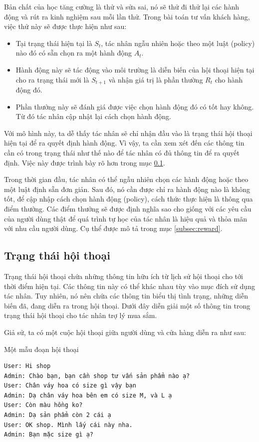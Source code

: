 Bản chất của học tăng cường là thử và sửa sai, nó sẽ thử đi thử lại
các hành động và rút ra kinh nghiệm sau mỗi lần thử. Trong bài toán
tư vấn khách hàng, việc thử này sẽ được thực hiện như sau:

\begin{itemize}
    \item Tại trạng thái hiện tại là $S_t$, tác nhân ngẫu nhiên hoặc
    theo một luật (policy) nào đó có sẵn chọn ra một hành động $A_t$.
    \item Hành động này sẽ tác động vào môi trường là diễn biến của
    hội thoại hiện tại cho ra trạng thái mới là $S_{t+1}$ và nhận
    giá trị là phần thường $R_t$ cho hành động đó.
    \item Phần thưởng này sẽ đánh giá được việc chọn hành động đó có
    tốt hay không. Từ đó tác nhân cập nhật lại cách chọn hành động.
\end{itemize}

Với mô hình này, ta dễ thấy tác nhân sẽ chỉ nhận đầu vào là
trạng thái hội thoại hiện tại để ra quyết định hành động.
Vì vậy, ta cần xem xét đến các thông tin cần có trong trạng thái
như thế nào để tác nhân có đủ thông tin để ra quyết định.
Việc này được trình bày rõ hơn trong mục \ref{subsec:state}.

Trong thời gian đầu, tác nhân có thể ngẫu nhiên chọn các hành động
hoặc theo một luật định sẵn đơn giản. Sau đó, nó cần được chỉ ra
hành động nào là không tốt, để cập nhập cách chọn hành động (policy),
cách thức thực hiện là thông qua điểm thưởng. Các điểm thưởng sẽ được
định nghĩa sao cho giống với các yêu cầu của người dùng thật để
quá trình tự học của tác nhân là hiệu quả và thỏa mãn với nhu cầu
người dùng. Cụ thể được mô tả trong mục \ref{subsec:reward}.

\subsection{Trạng thái hội thoại}
\label{subsec:state}
Trạng thái hội thoại chứa những thông tin hữu ích từ lịch sử
hội thoại cho tới thời điểm hiện tại. Các thông tin này có thể
khác nhau tùy vào mục đích sử dụng tác nhân. Tuy nhiên, nó nên chứa
các thông tin biểu thị tình trạng, những diễn biến đã, đang diễn ra
trong hội thoại. Dưới đây diễn giải một số thông tin trong trạng thái
hội thoại cho tác nhân trợ lý mua sắm.

Giả sử, ta có một cuộc hội thoại giữa người dùng và cửa hàng
diễn ra như sau:

\renewcommand{\textboxenvname}{Ví dụ}
\begin{textbox}{Một mẫu đoạn hội thoại}
\begin{Verbatim}[breaklines=true, breakanywhere=true]
User: Hi shop
Admin: Chào bạn, bạn cần shop tư vấn sản phẩm nào ạ?
User: Chân váy hoa có size gì vậy bạn
Admin: Dạ chân váy hoa bên em có size M, và L ạ
User: Còn màu hồng ko?
Admin: Dạ sản phẩm còn 2 cái ạ
User: OK shop. Mình lấy cái này nha.
Admin: Bạn mặc size gì ạ?
\end{Verbatim}
\end{textbox}

